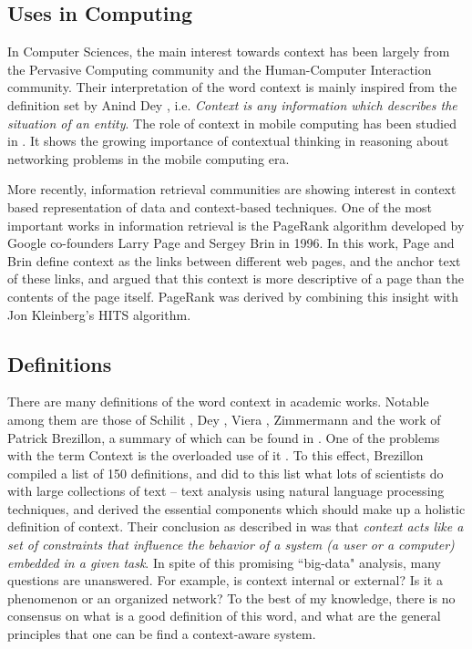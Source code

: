 \subsection{Uses in Computing}
In Computer Sciences, the main interest towards context has been largely from the Pervasive Computing community and the Human-Computer Interaction community. Their interpretation of the word context is mainly inspired from the definition set by Anind Dey \cite{dey2001understanding}, i.e. \emph{Context is any information which describes the situation of an entity}. The role of context in mobile computing has been studied in \cite{chen2000survey}. It shows the growing importance of contextual thinking in reasoning about networking problems in the mobile computing era. 

More recently, information retrieval communities are showing interest in context based representation of data and context-based techniques. One of the most important works in information retrieval is the PageRank algorithm \cite{page1999pagerank} developed by Google co-founders Larry Page and Sergey Brin in 1996. In this work, Page and Brin define context as the links between different web pages, and the anchor text of these links, and argued that this context is more descriptive of a page than the contents of the page itself. PageRank was derived by combining this insight with Jon Kleinberg's HITS \cite{kleinberg1999authoritative} algorithm.

\subsection{Definitions}
There are many definitions of the word context in academic works. Notable among them are those of Schilit \cite{schilit1994context}, Dey \cite{dey2001understanding}, Viera \cite{vieira2011designing}, Zimmermann \cite{zimmermann2007operational} and the work of Patrick Brezillon, a summary of which can be found in \cite{mostefaoui2004context}. One of the problems with the term Context is the overloaded use of it \cite{henricksen2002modeling}. To this effect, Brezillon compiled a list of 150 definitions, and did to this list what lots of scientists do with large collections of text -- text analysis using natural language processing techniques, and derived the essential components which should make up a holistic definition of context. Their conclusion as described in \cite{bazire2005understanding} was that \textit{context acts like a set of constraints that influence the behavior of a system (a user or a computer) embedded in a given task}. In spite of this promising ``big-data" analysis, many questions are unanswered. For example, is context internal or external? Is it a phenomenon or an organized network? To the best of my knowledge, there is no consensus on what is a good definition of this word, and what are the general principles that one can be find a context-aware system.

